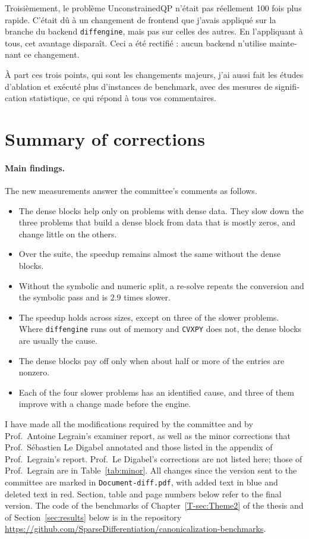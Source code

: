 \documentclass[letterpaper,12pt]{article}
\begin{document}
\begin{otherlanguage}{french}
Troisièmement, le problème UnconstrainedQP n'était pas réellement 100 fois plus rapide. C'était
dû à un changement de frontend que j'avais appliqué sur la branche du backend
\texttt{diffengine}, mais pas sur celles des autres. En l'appliquant à tous, cet avantage
disparaît. Ceci a été rectifié : aucun backend n'utilise maintenant ce changement.

À part ces trois points, qui sont les changements majeurs, j'ai aussi fait les études
d'ablation et exécuté plus d'instances de benchmark, avec des mesures de signification
statistique, ce qui répond à tous vos commentaires.
\end{otherlanguage}

\section{Summary of corrections}

\paragraph{Main findings.} The new measurements answer the committee's comments as follows.
\begin{itemize}
\item The dense blocks help only on problems with dense data. They slow down the three problems
  that build a dense block from data that is mostly zeros, and change little on the others.
\item Over the suite, the speedup remains almost the same without the dense blocks.
\item Without the symbolic and numeric split, a re-solve repeats the conversion and the symbolic
  pass and is $2.9$ times slower.
\item The speedup holds across sizes, except on three of the slower problems. Where
  \texttt{diffengine} runs out of memory and \texttt{CVXPY} does not, the dense blocks are
  usually the cause.
\item The dense blocks pay off only when about half or more of the entries are nonzero.
\item Each of the four slower problems has an identified cause, and three of them improve with a
  change made before the engine.
\end{itemize}


I have made all the modifications required by the committee and by Prof.~Antoine Legrain's
examiner report, as well as the minor corrections that Prof.~Sébastien Le Digabel annotated and
those listed in the appendix of Prof.~Legrain's report. Prof.~Le Digabel's corrections are not
listed here; those of Prof.~Legrain are in Table~\ref{tab:minor}.
All changes since the version sent to the committee are marked in \texttt{Document-diff.pdf},
with added text in blue and deleted text in red. Section, table and page numbers below refer to
the final version.
The code of the benchmarks of Chapter~\ref{T-sec:Theme2} of the thesis and of
Section~\ref{sec:results} below is in
the repository \url{https://github.com/SparseDifferentiation/canonicalization-benchmarks}.
\end{document}

